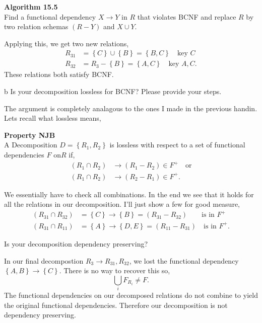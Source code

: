 \documentclass[working, oneside]{../../Preambles/tuftebook}
\newenvironment{SimpleBox}[1]{%
  \begin{mdframed}%
    \noindent\textbf{#1}\\[1ex]
}{%
  \end{mdframed}%
}
\begin{document}
\begin{SimpleBox}{Algorithm 15.5}
Find a functional dependency $X \to Y$ in $R$ that violates BCNF and replace $R$ by two relation schemas $ \left( R - Y \right) $ and $X \cup Y$.
\end{SimpleBox}
Applying this, we get two new relations,
\begin{align*}
    R_{31} &= \left\{ C \right\} \cup \left\{ B \right\} = \left\{ B, C \right\} \quad \text{key }C\\
    R_{32} &= R_3 - \left\{ B \right\} = \left\{ A, C \right\} \quad \text{key }A,C
.\end{align*}
These relations both satisfy BCNF.
\begin{subexercise}{b}
Is your decomposition lossless for BCNF? Please provide your steps.
\end{subexercise}
The argument is completely analagous to the ones I made in the previous handin. Lets recall what lossless means,
\begin{SimpleBox}{Property NJB}
    A Decomposition $D = \left\{ R_1, R_2 \right\} $ is lossless with respect to a set of functional dependencies $F$ on$R$  if,
    \begin{align*}
        \left( R_1 \cap R_2 \right) &\to \left( R_1 - R_2 \right)  \in F^{+}\quad\text{or}\\
        \left( R_1 \cap R_2 \right) &\to \left( R_2 - R_1 \right)  \in F^{+}
    .\end{align*}
\end{SimpleBox}
We essentially have to check all combinations. In the end we see that it holds for all the relations in our decomposition. I'll just show a few for good measure,
\begin{align*}
    \left( R_{31} \cap R_{32} \right) &= \left\{ C \right\}  \to \left\{ B \right\} = \left( R_{31} - R_{32} \right)  \quad\quad \text{is in }F^{+}\\
    \left( R_{31} \cap R_{11} \right) &= \left\{ A \right\} \to \left\{ D, E \right\} = \left( R_{11}-R_{31} \right) \quad \text{is in }F^{+}
.\end{align*}
\begin{subexercise}{3}
Is your decomposition dependency preserving?
\end{subexercise}
In our final decompostion $R_3 \to R_{31}, R_{32}$, we lost the functional dependency $\left\{ A, B \right\} \to  \left\{ C \right\} $. There is no way to recover this so,
\[
\bigcup_i F_{R_i} \neq F
.\] 
The functional dependencies on our decomposed relations do not combine to yield the original functional dependencies. Therefore our decomposition is not dependency preserving.
\end{document}
